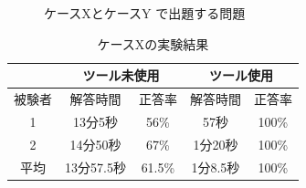 \begin{figure}[tp]
	\centering
	\caption{ケースXとケースY で出題する問題}
	\label{fig:mondai}
\end{figure}

\begin{table}[tp]
  \begin{center}
    \caption{ケースXの実験結果}
    \label{resultX}
    \begin{tabular}{c|c|c|c|c|}
    \cline{2-5}
                              & \multicolumn{2}{c|}{ツール未使用} & \multicolumn{2}{c|}{ツール使用} \\ \hline
    \multicolumn{1}{|c||}{被験者} & 解答時間           & 正答率          & 解答時間           & 正答率         \\ \hline\hline
    \multicolumn{1}{|c||}{1}   & 13分5秒           & 56\%         & 57秒           & 100\%         \\ \hline
    \multicolumn{1}{|c||}{2}   & 14分50秒          & 67\%          & 1分20秒          & 100\%         \\ \hline\hline
    \multicolumn{1}{|c||}{平均}   & 13分57.5秒          & 61.5\%          & 1分8.5秒          & 100\%         \\ \hline
    \end{tabular}
  \end{center}
\end{table}

